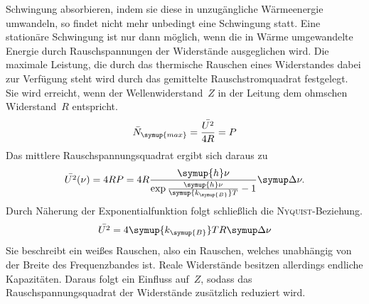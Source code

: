 Schwingung absorbieren, indem sie diese in unzugängliche Wärmeenergie umwandeln,
so findet nicht mehr unbedingt eine Schwingung statt. Eine stationäre Schwingung
ist nur dann möglich, wenn die in Wärme umgewandelte Energie durch
Rauschspannungen der Widerstände ausgeglichen wird. Die maximale Leistung, die
durch das thermische Rauschen eines Widerstandes dabei zur Verfügung steht wird
durch das gemittelte Rauschstromquadrat festgelegt. Sie wird erreicht, wenn der
Wellenwiderstand~$Z$ in der Leitung dem ohmschen Widerstand~$R$ entspricht.
%
\begin{equation}
  \bar{N}_{\symup{max}}=\frac{\bar{U^2}}{4R}=P
\end{equation}
%
Das mittlere Rauschspannungsquadrat ergibt sich daraus zu
%
\begin{equation}
  \bar{U^2}(\nu)=4RP=4R\frac{\symup{h}\nu}{\exp{\frac{\symup{h}\nu}{\symup{k_{\symup{B}}}T}}-1}\upD\nu.
\end{equation}
%
Durch Näherung der Exponentialfunktion folgt schließlich die
\textsc{Nyquist}-Beziehung.
%
\begin{equation}
  \bar{U^2}=4\symup{k_{\symup{B}}}TR\upD\nu
  \label{eq:boltzmann}
\end{equation}
%
Sie beschreibt ein weißes Rauschen, also ein Rauschen, welches unabhängig von
der Breite des Frequenzbandes ist. Reale Widerstände besitzen allerdings
endliche Kapazitäten. Daraus folgt ein Einfluss auf~$Z$, sodass das
Rauschspannungsquadrat der Widerstände zusätzlich reduziert wird.

